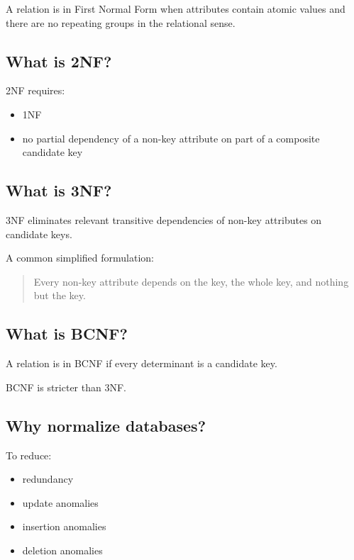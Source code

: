 A relation is in First Normal Form when attributes contain atomic values and there are no repeating groups in the relational sense.

\medskip

\subsection{What is 2NF?}

2NF requires:

\begin{itemize}
  \item 1NF
  \item no partial dependency of a non-key attribute on part of a composite candidate key
\end{itemize}

\medskip

\subsection{What is 3NF?}

3NF eliminates relevant transitive dependencies of non-key attributes on candidate keys.

A common simplified formulation:

\begin{quote}
Every non-key attribute depends on the key, the whole key, and nothing but the key.\\
\end{quote}

\medskip

\subsection{What is BCNF?}

A relation is in BCNF if every determinant is a candidate key.

BCNF is stricter than 3NF.

\medskip

\subsection{Why normalize databases?}

To reduce:

\begin{itemize}
  \item redundancy
  \item update anomalies
  \item insertion anomalies
  \item deletion anomalies
\end{itemize}

